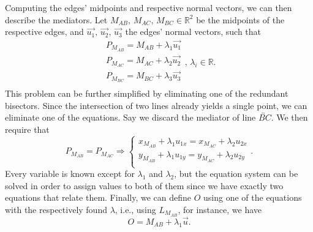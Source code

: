\begin{comment}
This comes as a direct result from applying a rotation transformation of 90
degrees, or $\pi/2$ radians, to $\vec{u}$, like so
%
\[
  \vec{n} = R(\pi/2)\vec{u}%
  = \begin{bmatrix}
      \cos(\pi/2) & -\sin(\pi/2) \\
      \sin(\pi/2) & \cos(\pi/2)
    \end{bmatrix}
    \begin{bmatrix}
      u_1 \\ u_2
    \end{bmatrix}
  = \begin{bmatrix}
      0 & -1 \\
      1 & 0
    \end{bmatrix}
    \begin{bmatrix}
      u_1 \\ u_2
    \end{bmatrix}
  = \begin{bmatrix}
      -u_2 \\ u_1
    \end{bmatrix}.
\]
%
Let $\vec{u},\,\vec{n} \in \mathbb{R}^2$, such that $\vec{u} = (u_x,
u_y),\,\vec{n} = (-u_y, u_x)$.  From~\eqref{eq:vector.dot.2}, we have
\[ \vec{u} \cdot \vec{n} = u_x u_y - u_y u_x = 0.  \]
\end{comment}

Computing the edges' midpoints and respective normal vectors, we can then
describe the mediators.  Let $M_{AB},\,M_{AC},\,M_{BC} \in \mathbb{R}^2$ be the
midpoints of the respective edges, and $\vec{u_1},\,\vec{u_2},\,\vec{u_3}$ the
edges' normal vectors, such that
\[
  \begin{split}
    P_{M_{AB}} = M_{AB} + \lambda_1 \vec{u_1} \\
    P_{M_{AC}} = M_{AC} + \lambda_2 \vec{u_2} \\
    P_{M_{BC}} = M_{BC} + \lambda_3 \vec{u_3} \\
  \end{split},\,\lambda_i \in \mathbb{R}.
\]
This problem can be further simplified by eliminating one of the redundant
bisectors.  Since the intersection of two lines already yields a single point,
we can eliminate one of the equations.  Say we discard the mediator of line
$\overleftrightarrow{BC}$.  We then require that
\[
  P_{M_{AB}} = P_{M_{AC}} \Rightarrow
  \begin{cases}
    x_{M_{AB}} + \lambda_1 u_{1x} = x_{M_{AC}} + \lambda_2 u_{2x} \\
    y_{M_{AB}} + \lambda_1 u_{1y} = y_{M_{AC}} + \lambda_2 u_{2y} \\
  \end{cases}.
\]
Every variable is known except for $\lambda_1$ and $\lambda_2$, but the equation
system can be solved in order to assign values to both of them since we have
exactly two equations that relate them.  Finally, we can define $O$ using one of
the equations with the respectively found $\lambda$, i.e., using $L_{M_{AB}}$,
for instance, we have
\[
  O = M_{AB} + \lambda_1 \vec{u}.
\]

